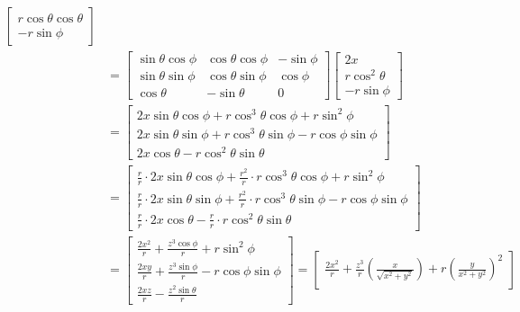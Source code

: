 \begin{problema}
\begin{enumerate}
\begin{sol}
\begin{align*}
\begin{bmatrix}
                r\cos\theta\cos\theta\\
                -r\sin\phi 
            \end{bmatrix}\\
            &= \begin{bmatrix}
                \sin \theta \cos\phi & \cos\theta \cos\phi &-\sin\phi\\
                \sin\theta \sin\phi & \cos\theta \sin\phi &\cos \phi\\
                \cos\theta & -\sin \theta & 0
            \end{bmatrix}\begin{bmatrix}
                2x\\
                r\cos^2\theta\\
                -r\sin\phi 
            \end{bmatrix}\\
            &= \begin{bmatrix}
                2x\sin\theta\cos\phi+r\cos^3\theta\cos\phi +r\sin^2 \phi \\
                2x\sin\theta\sin \phi +r\cos^3\theta\sin\phi -r\cos\phi\sin \phi \\
                2x\cos\theta -r\cos^2\theta \sin\theta
            \end{bmatrix}\\
            &= \begin{bmatrix}
                \frac{r}{r}\cdot 2x\sin\theta\cos\phi+\frac{r^2}{r}\cdot r\cos^3\theta\cos\phi +r\sin^2 \phi \\
                \frac{r}{r}\cdot 2x\sin\theta\sin \phi +\frac{r^2}{r}\cdot r\cos^3\theta\sin\phi -r\cos\phi\sin \phi \\
                \frac{r}{r}\cdot 2x\cos\theta - \frac{r}{r}\cdot r\cos^2\theta \sin\theta
            \end{bmatrix}\\
            &= \begin{bmatrix}
                \frac{2x^2}{r}+\frac{z^3\cos\phi}{r} +r\sin^2 \phi \\
                \frac{2xy}{r}+\frac{ z^3\sin\phi}{r} -r\cos\phi\sin \phi \\
                \frac{2xz}{r} - \frac{z^2\sin\theta}{r}
            \end{bmatrix} = \begin{bmatrix}
                \frac{2x^2}{r}+\frac{z^3}{r}\left(\frac{x}{\sqrt{x^2+y^2}}\right) +r\left(\frac{y}{x^2+y^2}\right)^2 \\

\end{bmatrix}
\end{align*}
\end{sol}
\end{enumerate}
\end{problema}

